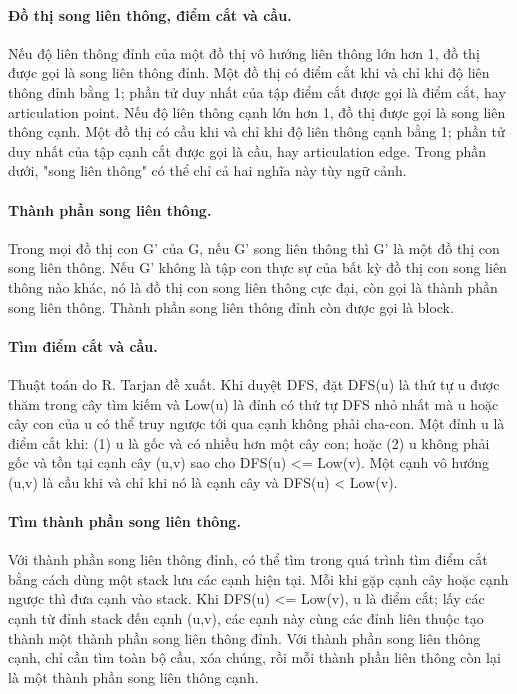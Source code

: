 \documentclass[11pt]{article}
\begin{document}
\paragraph{Đồ thị song liên thông, điểm cắt và cầu.} Nếu độ liên thông đỉnh của một đồ thị vô hướng liên thông lớn hơn 1, đồ thị được gọi là song liên thông đỉnh. Một đồ thị có điểm cắt khi và chỉ khi độ liên thông đỉnh bằng 1; phần tử duy nhất của tập điểm cắt được gọi là điểm cắt, hay articulation point. Nếu độ liên thông cạnh lớn hơn 1, đồ thị được gọi là song liên thông cạnh. Một đồ thị có cầu khi và chỉ khi độ liên thông cạnh bằng 1; phần tử duy nhất của tập cạnh cắt được gọi là cầu, hay articulation edge. Trong phần dưới, "song liên thông" có thể chỉ cả hai nghĩa này tùy ngữ cảnh.

\paragraph{Thành phần song liên thông.} Trong mọi đồ thị con G' của G, nếu G' song liên thông thì G' là một đồ thị con song liên thông. Nếu G' không là tập con thực sự của bất kỳ đồ thị con song liên thông nào khác, nó là đồ thị con song liên thông cực đại, còn gọi là thành phần song liên thông. Thành phần song liên thông đỉnh còn được gọi là block.

\paragraph{Tìm điểm cắt và cầu.} Thuật toán do R. Tarjan đề xuất. Khi duyệt DFS, đặt DFS(u) là thứ tự u được thăm trong cây tìm kiếm và Low(u) là đỉnh có thứ tự DFS nhỏ nhất mà u hoặc cây con của u có thể truy ngược tới qua cạnh không phải cha-con. Một đỉnh u là điểm cắt khi: (1) u là gốc và có nhiều hơn một cây con; hoặc (2) u không phải gốc và tồn tại cạnh cây (u,v) sao cho DFS(u) \textless{}= Low(v). Một cạnh vô hướng (u,v) là cầu khi và chỉ khi nó là cạnh cây và DFS(u) \textless{} Low(v).

\paragraph{Tìm thành phần song liên thông.} Với thành phần song liên thông đỉnh, có thể tìm trong quá trình tìm điểm cắt bằng cách dùng một stack lưu các cạnh hiện tại. Mỗi khi gặp cạnh cây hoặc cạnh ngược thì đưa cạnh vào stack. Khi DFS(u) \textless{}= Low(v), u là điểm cắt; lấy các cạnh từ đỉnh stack đến cạnh (u,v), các cạnh này cùng các đỉnh liên thuộc tạo thành một thành phần song liên thông đỉnh. Với thành phần song liên thông cạnh, chỉ cần tìm toàn bộ cầu, xóa chúng, rồi mỗi thành phần liên thông còn lại là một thành phần song liên thông cạnh.
\end{document}
